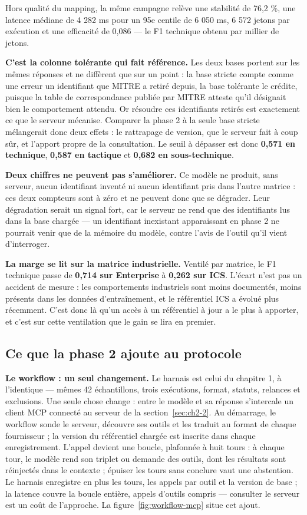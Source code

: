 Hors qualité du mapping, la même campagne relève une stabilité de 76,2 \%, une latence médiane de 4 282 ms pour un 95e centile de 6 050 ms, 6 572 jetons par exécution et une efficacité de 0,086 --- le F1 technique obtenu par millier de jetons.

\textbf{C'est la colonne tolérante qui fait référence.} Les deux bases portent sur les mêmes réponses et ne diffèrent que sur un point : la base stricte compte comme une erreur un identifiant que MITRE a retiré depuis, la base tolérante le crédite, puisque la table de correspondance publiée par MITRE atteste qu'il désignait bien le comportement attendu. Or résoudre ces identifiants retirés est exactement ce que le serveur mécanise. Comparer la phase 2 à la seule base stricte mélangerait donc deux effets : le rattrapage de version, que le serveur fait à coup sûr, et l'apport propre de la consultation. Le seuil à dépasser est donc \textbf{0,571 en technique}, \textbf{0,587 en tactique} et \textbf{0,682 en sous-technique}.

\textbf{Deux chiffres ne peuvent pas s'améliorer.} Ce modèle ne produit, sans serveur, aucun identifiant inventé ni aucun identifiant pris dans l'autre matrice : ces deux compteurs sont à zéro et ne peuvent donc que se dégrader. Leur dégradation serait un signal fort, car le serveur ne rend que des identifiants lus dans la base chargée --- un identifiant inexistant apparaissant en phase 2 ne pourrait venir que de la mémoire du modèle, contre l'avis de l'outil qu'il vient d'interroger.

\textbf{La marge se lit sur la matrice industrielle.} Ventilé par matrice, le F1 technique passe de \textbf{0,714 sur Enterprise} à \textbf{0,262 sur ICS}. L'écart n'est pas un accident de mesure : les comportements industriels sont moins documentés, moins présents dans les données d'entraînement, et le référentiel ICS a évolué plus récemment. C'est donc là qu'un accès à un référentiel à jour a le plus à apporter, et c'est sur cette ventilation que le gain se lira en premier.

\subsection{Ce que la phase 2 ajoute au protocole}\label{sec:ch2-3-2}

\textbf{Le workflow : un seul changement.} Le harnais est celui du chapitre 1, à l'identique --- mêmes 42 échantillons, trois exécutions, format, statuts, relances et exclusions. Une seule chose change : entre le modèle et sa réponse s'intercale un client MCP connecté au serveur de la section~\ref{sec:ch2-2}. Au démarrage, le workflow sonde le serveur, découvre ses outils et les traduit au format de chaque fournisseur ; la version du référentiel chargée est inscrite dans chaque enregistrement. L'appel devient une boucle, plafonnée à huit tours : à chaque tour, le modèle rend son triplet ou demande des outils, dont les résultats sont réinjectés dans le contexte ; épuiser les tours sans conclure vaut une abstention. Le harnais enregistre en plus les tours, les appels par outil et la version de base ; la latence couvre la boucle entière, appels d'outils compris --- consulter le serveur est un coût de l'approche. La figure~\ref{fig:workflow-mcp} situe cet ajout.

